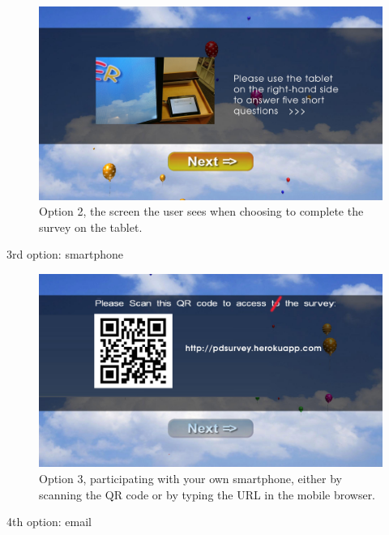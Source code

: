     \begin{figure}
        \begin{center}
            \includegraphics[width=\columnwidth]{img/screenshots/option-tablet.jpg}
        \end{center}
     \caption{Option 2, the screen the user sees when choosing to complete the survey on the tablet.}
     \label{screenshot:tablet-option}
    \end{figure}


    3rd option: smartphone

    \begin{figure}
        \begin{center}
            \includegraphics[width=\columnwidth]{img/screenshots/option-smartphone.jpg}
        \end{center}
     \caption{Option 3, participating with your own smartphone, either by scanning the QR code or by typing the URL in the mobile browser.}
     \label{screenshot:smartphone-option}
    \end{figure}


    4th option: email

